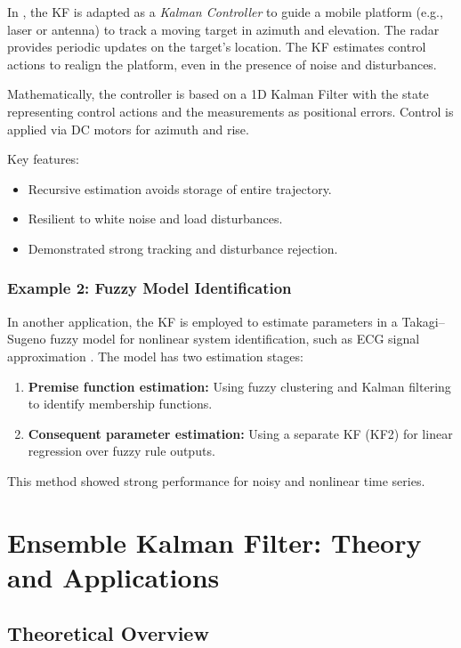 \documentclass[a4paper]{article}
\begin{document}
In \textcite{ghanai2009kalman}, the KF is adapted as a \textit{Kalman Controller} to guide a mobile platform (e.g., laser or antenna) to track a moving target in azimuth and elevation. The radar provides periodic updates on the target's location. The KF estimates control actions to realign the platform, even in the presence of noise and disturbances.

Mathematically, the controller is based on a 1D Kalman Filter with the state representing control actions and the measurements as positional errors. Control is applied via DC motors for azimuth and rise.

Key features:
\begin{itemize}
  \item Recursive estimation avoids storage of entire trajectory.
  \item Resilient to white noise and load disturbances.
  \item Demonstrated strong tracking and disturbance rejection.
\end{itemize}

\subsubsection*{Example 2: Fuzzy Model Identification}

In another application, the KF is employed to estimate parameters in a Takagi–Sugeno fuzzy model for nonlinear system identification, such as ECG signal approximation \parencite{ghanai2009kalman}. The model has two estimation stages:

\begin{enumerate}
  \item \textbf{Premise function estimation:} Using fuzzy clustering and Kalman filtering to identify membership functions.
  \item \textbf{Consequent parameter estimation:} Using a separate KF (KF2) for linear regression over fuzzy rule outputs.
\end{enumerate}

This method showed strong performance for noisy and nonlinear time series.


\section{Ensemble Kalman Filter: Theory and Applications}

\subsection{Theoretical Overview}
\end{document}
